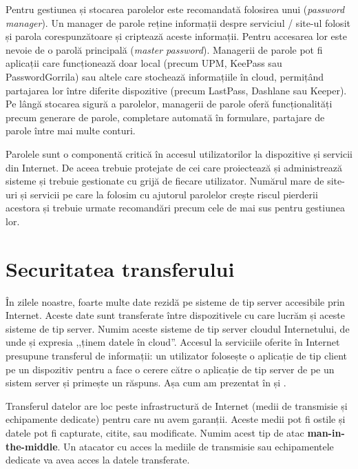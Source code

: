 Pentru gestiunea și stocarea parolelor este recomandată folosirea unui  (\textit{password manager}). Un manager de parole reține informații despre serviciul / site-ul folosit și parola corespunzătoare și criptează aceste informații. Pentru accesarea lor este nevoie de o parolă principală (\textit{master password}). Managerii de parole pot fi aplicații care funcționează doar local (precum UPM, KeePass sau PasswordGorrila) sau altele care stochează informațiile în cloud, permițând partajarea lor între diferite dispozitive (precum LastPass, Dashlane sau Keeper). Pe lângă stocarea sigură a parolelor, managerii de parole oferă funcționalități precum generare de parole, completare automată în formulare, partajare de parole între mai multe conturi.

Parolele sunt o componentă critică în accesul utilizatorilor la dispozitive și servicii din Internet. De aceea trebuie protejate de cei care proiectează și administrează sisteme și trebuie gestionate cu grijă de fiecare utilizator. Numărul mare de site-uri și servicii pe care la folosim cu ajutorul parolelor crește riscul pierderii acestora și trebuie urmate recomandări precum cele de mai sus pentru gestiunea lor.

\section{Securitatea transferului}
\label{sec:sec:transfer}

În zilele noastre, foarte multe date rezidă pe sisteme de tip server accesibile prin Internet. Aceste date sunt transferate între dispozitivele cu care lucrăm și aceste sisteme de tip server. Numim aceste sisteme de tip server cloudul Internetului, de unde și expresia ,,ținem datele în cloud''. Accesul la serviciile oferite în Internet presupune transferul de informații: un utilizator folosește o aplicație de tip client pe un dispozitiv pentru a face o cerere către o aplicație de tip server de pe un sistem server și primește un răspuns. Așa cum am prezentat în  și .

Transferul datelor are loc peste infrastructură de Internet (medii de transmisie și echipamente dedicate) pentru care nu avem garanții. Aceste medii pot fi ostile și datele pot fi capturate, citite, sau modificate. Numim acest tip de atac \textbf{man-in-the-middle}. Un atacator cu acces la mediile de transmisie sau echipamentele dedicate va avea acces la datele transferate.

